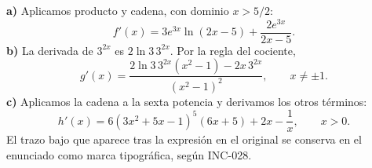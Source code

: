 \textbf{a)} Aplicamos producto y cadena, con dominio $x>5/2$:
\[
 f'(x)=3e^{3x}\ln(2x-5)+\frac{2e^{3x}}{2x-5}.
\]
\textbf{b)} La derivada de $3^{2x}$ es $2\ln3\,3^{2x}$. Por la regla del cociente,
\[
 g'(x)=\frac{2\ln3\,3^{2x}(x^2-1)-2x\,3^{2x}}{(x^2-1)^2},
 \qquad x\ne\pm1.
\]
\textbf{c)} Aplicamos la cadena a la sexta potencia y derivamos los otros términos:
\[
 h'(x)=6(3x^2+5x-1)^5(6x+5)+2x-\frac1x,
 \qquad x>0.
\]
El trazo bajo que aparece tras la expresión en el original se conserva en el enunciado como marca tipográfica, según INC-028.
